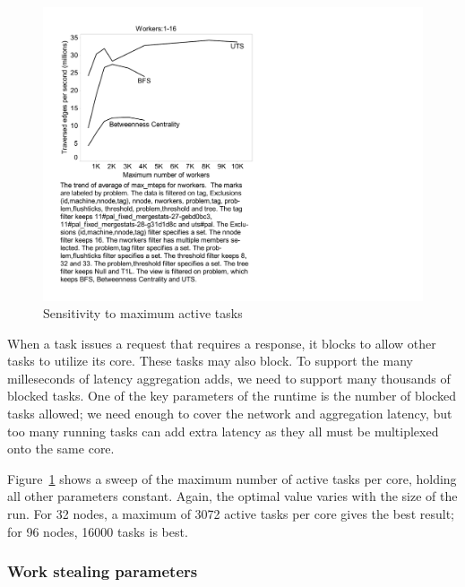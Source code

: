 \begin{figure}[htb]
\begin{center}
  \includegraphics[width=0.95\columnwidth]{figs/worker_sweep}
\begin{minipage}{0.95\columnwidth} 
  \caption{\label{fig:bfs-sweep-workers} Sensitivity to maximum active tasks}
\end{minipage}
\vspace{-3ex}
\end{center}
\end{figure}

When a task issues a request that requires a response, it blocks to
allow other tasks to utilize its core. These tasks may also block. To
support the many milleseconds of latency aggregation adds, we need to
support many thousands of blocked tasks. One of the key parameters of
the runtime is the number of blocked tasks allowed; we need enough to
cover the network and aggregation latency, but too many running tasks
can add extra latency as they all must be multiplexed onto the same core.

Figure~\ref{fig:bfs-sweep-workers} shows a sweep of the maximum number
of active tasks per core, holding all other parameters
constant. Again, the optimal value varies with the size of the
run. For 32 nodes, a maximum of 3072 active tasks per core gives the
best result; for 96 nodes, 16000 tasks is best. 

\subsubsection{Work stealing parameters}

